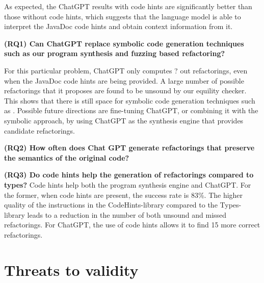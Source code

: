 \documentclass[10pt,conference]{IEEEtran}
\begin{document}
As expected, the ChatGPT results with code hints are significantly better than those without code hints, which suggests that the language model is able to interpret the JavaDoc code hints and obtain context information from it.


{\bf (RQ1) Can ChatGPT replace symbolic code generation techniques such as our program synthesis and fuzzing based refactoring?}

For this particular problem, ChatGPT only computes ? out refactorings, even when the JavaDoc code hints are being provided. A large number of possible
refactorings that it proposes are found to be unsound by our equility checker. This shows that there is still space for symbolic code generation
techniques such as \tool. Possible future directions are fine-tuning ChatGPT, or combining it with the symbolic approach, by using ChatGPT as the synthesis
engine that provides candidate refactorings.

{\bf (RQ2) How often does Chat GPT generate refactorings that preserve the semantics of the original code?}


{\bf (RQ3) Do code hints help the generation of refactorings compared to types?}
Code hints help both the program synthesis engine and ChatGPT.
For the former, when code hints are present, the success rate is 83\%.
The higher quality of the instructions in the CodeHints-library compared to the
Types-library leads to  a reduction in 
the number of both unsound and missed refactorings.
For ChatGPT, the use of code hints allows it to find 15 more correct refactorings.


\section{Threats to validity}
\end{document}
